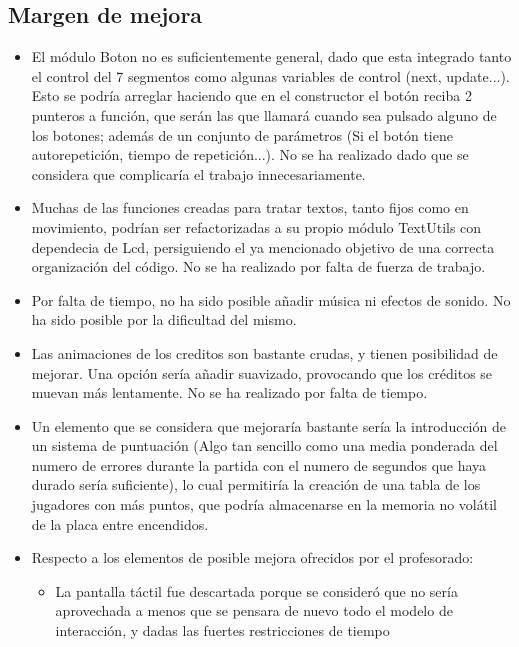 \documentclass[12pt,letterpaper]{article}
\begin{document}
\subsection{Margen de mejora}
\label{sec:mejora}
\begin{itemize}
  \item El módulo Boton no es suficientemente general, dado que esta
    integrado tanto el control del 7 segmentos como algunas variables
    de control (next, update...). Esto se podría arreglar haciendo que
    en el constructor el botón reciba 2 punteros a función, que serán
    las que llamará cuando sea pulsado alguno de los botones; además
    de un conjunto de parámetros (Si el botón tiene autorepetición,
    tiempo de repetición...). No se ha realizado dado que se considera
    que complicaría el trabajo innecesariamente.
  \item Muchas de las funciones creadas para tratar textos, tanto
    fijos como en movimiento, podrían ser refactorizadas a su propio
    módulo TextUtils con dependecia de Lcd, persiguiendo el ya
    mencionado objetivo de una correcta organización del código. No se
    ha realizado por falta de fuerza de trabajo.
  \item Por falta de tiempo, no ha sido posible añadir música ni
    efectos de sonido. No ha sido posible por la dificultad del mismo.
  \item Las animaciones de los creditos son bastante crudas, y tienen
    posibilidad de mejorar. Una opción sería añadir suavizado,
    provocando que los créditos se muevan más lentamente. No se ha
    realizado por falta de tiempo.
  \item Un elemento que se considera que mejoraría bastante sería la
    introducción de un sistema de puntuación (Algo tan sencillo como
    una media ponderada del numero de errores durante la partida con
    el numero de segundos que haya durado sería suficiente), lo cual
    permitiría la creación de una tabla de los jugadores con más
    puntos, que podría almacenarse en la memoria no volátil de la
    placa entre encendidos.
  \item Respecto a los elementos de posible mejora ofrecidos por el
    profesorado:
    \begin{itemize}
    \item La pantalla táctil fue descartada porque se consideró que no
      sería aprovechada a menos que se pensara de nuevo todo el modelo
      de interacción, y dadas las fuertes restricciones de tiempo

\end{itemize}
\end{itemize}
\end{document}
